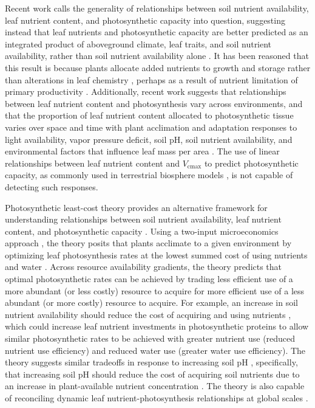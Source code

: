 Recent work calls the generality of relationships between soil nutrient availability, leaf nutrient content, and photosynthetic capacity into question, suggesting instead that leaf nutrients and photosynthetic capacity are better predicted as an integrated product of aboveground climate, leaf traits, and soil nutrient availability, rather than soil nutrient availability alone . It has been reasoned that this result is because plants allocate added nutrients to growth and storage rather than alterations in leaf chemistry , perhaps as a result of nutrient limitation of primary productivity . Additionally, recent work suggests that relationships between leaf nutrient content and photosynthesis vary across environments, and that the proportion of leaf nutrient content allocated to photosynthetic tissue varies over space and time with plant acclimation and adaptation responses to light availability, vapor pressure deficit, soil pH, soil nutrient availability, and environmental factors that influence leaf mass per area . The use of linear relationships between leaf nutrient content and $V_\mathrm{cmax}$ to predict photosynthetic capacity, as commonly used in terrestrial biosphere models , is not capable of detecting such responses.

Photosynthetic least-cost theory provides an alternative framework for understanding relationships between soil nutrient availability, leaf nutrient content, and photosynthetic capacity . Using a two-input microeconomics approach , the theory posits that plants acclimate to a given environment by optimizing leaf photosynthesis rates at the lowest summed cost of using nutrients and water . Across resource availability gradients, the theory predicts that optimal photosynthetic rates can be achieved by trading less efficient use of a more abundant (or less costly) resource to acquire for more efficient use of a less abundant (or more costly) resource to acquire. For example, an increase in soil nutrient availability should reduce the cost of acquiring and using nutrients , which could increase leaf nutrient investments in photosynthetic proteins to allow similar photosynthetic rates to be achieved with greater nutrient use (reduced nutrient use efficiency) and reduced water use (greater water use efficiency). The theory suggests similar tradeoffs in response to increasing soil pH , specifically, that increasing soil pH should reduce the cost of acquiring soil nutrients due to an increase in plant-available nutrient concentration . The theory is also capable of reconciling dynamic leaf nutrient-photosynthesis relationships at global scales .

